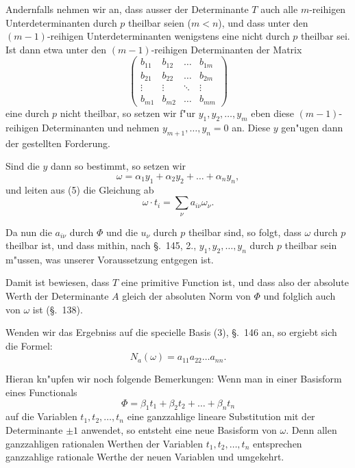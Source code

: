\documentclass[12pt,a4paper]{article}
\theoremstyle{definition}
\begin{document}
Andernfalls nehmen wir an, dass ausser der Determinante $T$ auch alle $m$-reihigen Unterdeterminanten durch $p$ theilbar seien ($m < n$), und dass unter den $(m-1)$-reihigen Unterdeterminanten wenigstens eine nicht durch $p$ theilbar sei. Ist dann etwa unter den $(m-1)$-reihigen Determinanten der Matrix
\begin{equation}
\begin{pmatrix}
b_{11} & b_{12} & \dots & b_{1m} \\
b_{21} & b_{22} & \dots & b_{2m} \\
\vdots & \vdots & \ddots & \vdots \\
b_{m1} & b_{m2} & \dots & b_{mm}
\end{pmatrix}
\end{equation}
eine durch $p$ nicht theilbar, so setzen wir f"ur $y_1, y_2, \dots, y_m$ eben diese $(m-1)$-reihigen Determinanten und nehmen $y_{m+1}, \dots, y_n = 0$ an. Diese $y$ gen"ugen dann der gestellten Forderung.

Sind die $y$ dann so bestimmt, so setzen wir
\begin{equation}
\omega = \alpha_1 y_1 + \alpha_2 y_2 + \dots + \alpha_n y_n,
\end{equation}
und leiten aus (5) die Gleichung ab
\begin{equation}
\omega \cdot t_i = \sum_\nu a_{i\nu} \omega_\nu.
\end{equation}

Da nun die $a_{i\nu}$ durch $\Phi$ und die $u_\nu$ durch $p$ theilbar sind, so folgt, dass $\omega$ durch $p$ theilbar ist, und dass mithin, nach \S.~145, 2., $y_1, y_2, \dots, y_n$ durch $p$ theilbar sein m"ussen, was unserer Voraussetzung entgegen ist.

Damit ist bewiesen, dass $T$ eine primitive Function ist, und dass also der absolute Werth der Determinante $A$ gleich der absoluten Norm von $\Phi$ und folglich auch von $\omega$ ist (\S.~138).

Wenden wir das Ergebniss auf die specielle Basis (3), \S.~146 an, so ergiebt sich die Formel:
\begin{equation}
N_a(\omega) = a_{11} a_{22} \dots a_{nn}.
\end{equation}

Hieran kn"upfen wir noch folgende Bemerkungen: Wenn man in einer Basisform eines Functionals
\begin{equation}
\Phi = \beta_1 t_1 + \beta_2 t_2 + \dots + \beta_n t_n
\end{equation}
auf die Variablen $t_1, t_2, \dots, t_n$ eine ganzzahlige lineare Substitution mit der Determinante $\pm 1$ anwendet, so entsteht eine neue Basisform von $\omega$. Denn allen ganzzahligen rationalen Werthen der Variablen $t_1, t_2, \dots, t_n$ entsprechen ganzzahlige rationale Werthe der neuen Variablen und umgekehrt.
\end{document}
